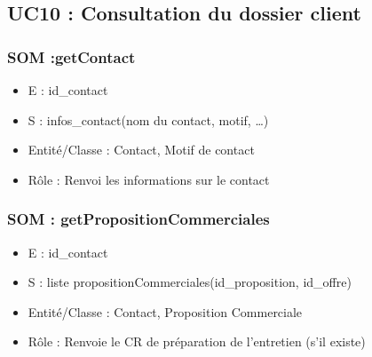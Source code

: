 \subsection{UC10 : Consultation du dossier client}
\subsubsection{SOM :getContact}
\begin{itemize}
\item E : id\_contact
\item S : infos\_contact(nom du contact, motif, …)
\item Entité/Classe : Contact, Motif de contact
\item Rôle : Renvoi les informations sur le contact
\end{itemize}
\subsubsection{SOM : getPropositionCommerciales}
\begin{itemize}
\item E : id\_contact
\item S : liste propositionCommerciales(id\_proposition, id\_offre)
\item Entité/Classe : Contact, Proposition Commerciale
\item Rôle : Renvoie le CR de préparation de l’entretien (s’il existe)
\end{itemize}
